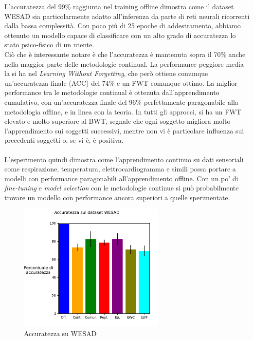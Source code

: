 L'accuratezza del 99\% raggiunta nel training offline dimostra come il dataset WESAD sia particolarmente adatto all'inferenza da parte di reti neurali ricorrenti dalla bassa complessità. Con poco più di 25 epoche di addestramento, abbiamo ottenuto un modello capace di classificare con un alto grado di accuratezza lo stato psico-fisico di un utente.\\
Ciò che è interessante notare è che l'accuratezza è mantenuta sopra il 70\% anche nella maggior parte delle metodologie continual. La performance peggiore media la si ha nel \textit{Learning Without Forgetting}, che però ottiene comunque un'accuratezza finale (ACC) del 74\% e un FWT comunque ottimo. La miglior performance tra le metodologie continual è ottenuta dall'apprendimento cumulativo, con un'accuratezza finale del 96\% perfettamente paragonabile alla metodologia offline, e in linea con la teoria. In tutti gli approcci, si ha un FWT elevato e molto superiore al BWT, segnale che ogni soggetto migliora molto l'apprendimento sui soggetti successivi, mentre non vi è particolare influenza sui precedenti soggetti o, se vi è, è positiva.\\\\
L'esperimento quindi dimostra come l'apprendimento continuo su dati sensoriali come respirazione, temperatura, elettrocardiogramma e simili possa portare a modelli con performance paragonabili all'apprendimento offline. Con un po' di \textit{fine-tuning} e \textit{model selection} con le metodologie continue si può probabilmente trovare un modello con performance ancora superiori a quelle sperimentate.
\begin{figure}[h]
	\begin{center}
		\includegraphics[width=0.65\textwidth]{img/graphs/wesad_final_accuracy.png}
		\caption{Accuratezza su WESAD}
		\label{fig:wesad_accuracy_graph}
	\end{center}
\end{figure}
\pagebreak
